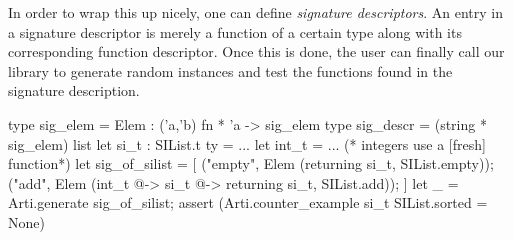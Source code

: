 In order to wrap this up nicely, one can define \emph{signature
  descriptors}. An entry in a signature descriptor is merely
a function of a certain type  along with its corresponding
function descriptor. Once this is done, the user can finally call our
library to generate random instances and test the functions found in
the signature description.
%
\begin{ocamlcode}
type sig_elem = Elem : ('a,'b) fn * 'a -> sig_elem
type sig_descr = (string * sig_elem) list
let si_t : SIList.t ty  = ...
let int_t = ... (* integers use a [fresh] function*)
let sig_of_silist = [
  ("empty", Elem (returning si_t, SIList.empty));
  ("add", Elem (int_t @-> si_t @-> returning si_t, SIList.add)); ]
let _ =
  Arti.generate sig_of_silist;
  assert (Arti.counter_example si_t SIList.sorted = None)
\end{ocamlcode}
%
